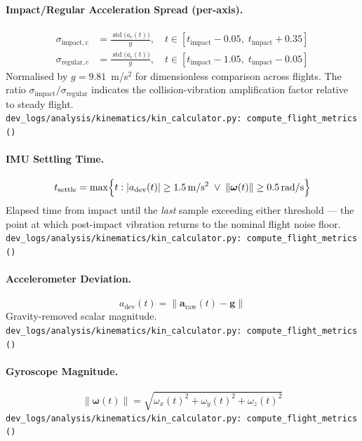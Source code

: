 \medskip
\paragraph{Impact/Regular Acceleration Spread (per-axis).}
\begin{align}
    \sigma_{\text{impact},c} &= \frac{\operatorname{std}\bigl(a_c(t)\bigr)}{g},\quad t \in [t_{\text{impact}} - 0.05,\; t_{\text{impact}} + 0.35] \\
    \sigma_{\text{regular},c} &= \frac{\operatorname{std}\bigl(a_c(t)\bigr)}{g},\quad t \in [t_{\text{impact}} - 1.05,\; t_{\text{impact}} - 0.05]
\end{align}
Normalised by $g = 9.81$~m/s$^{2}$ for dimensionless comparison across flights. The ratio $\sigma_{\text{impact}} / \sigma_{\text{regular}}$ indicates the collision-vibration amplification factor relative to steady flight.\\
\texttt{\small dev\_logs/analysis/kinematics/kin\_calculator.py:\ compute\_flight\_metrics()}

\medskip
\paragraph{IMU Settling Time.}
\begin{equation}
    t_{\text{settle}} = \max\Bigl\{ t : |a_{\text{dev}}(t)| \ge 1.5\,\mathrm{m/s^2} \;\lor\; \|\boldsymbol{\omega}(t)\| \ge 0.5\,\mathrm{rad/s} \Bigr\}
\end{equation}
Elapsed time from impact until the \emph{last} sample exceeding either threshold --- the point at which post-impact vibration returns to the nominal flight noise floor.\\
\texttt{\small dev\_logs/analysis/kinematics/kin\_calculator.py:\ compute\_flight\_metrics()}

\medskip
\paragraph{Accelerometer Deviation.}
\begin{equation}
    a_{\text{dev}}(t) = \|\mathbf{a}_{\text{raw}}(t) - \mathbf{g}\|
\end{equation}
Gravity-removed scalar magnitude.\\
\texttt{\small dev\_logs/analysis/kinematics/kin\_calculator.py:\ compute\_flight\_metrics()}

\medskip
\paragraph{Gyroscope Magnitude.}
\begin{equation}
    \|\boldsymbol{\omega}(t)\| = \sqrt{\omega_x(t)^2 + \omega_y(t)^2 + \omega_z(t)^2}
\end{equation}
\texttt{\small dev\_logs/analysis/kinematics/kin\_calculator.py:\ compute\_flight\_metrics()}

